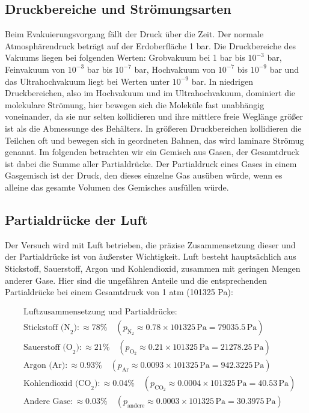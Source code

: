 \subsection{Druckbereiche und Strömungsarten}


Beim Evakuierungsvorgang fällt der Druck über die Zeit. Der normale Atmosphärendruck beträgt auf der Erdoberfläche 1 bar.
Die Druckbereiche des Vakuums liegen bei folgenden Werten:
Grobvakuum bei 1 bar bis $10^{-3}$ bar,  Feinvakuum von $10^{-3}$ bar bis $10^{-7}$ bar, Hochvakuum von $10^{-7}$ bis $10^{-9}$ bar und
das Ultrahochvakuum liegt bei Werten unter $10^{-9}$ bar.
In niedrigen Druckbereichen, also im Hochvakuum und im Ultrahochvakuum, dominiert die molekulare Strömung, hier bewegen sich die Moleküle fast unabhängig voneinander,
da sie nur selten kollidieren und ihre mittlere freie Weglänge größer ist als die Abmessunge des Behälters.
In größeren Druckbereichen kollidieren die Teilchen oft 
und bewegen sich in geordneten Bahnen, das wird laminare Strömug genannt.
Im folgenden betrachten wir ein Gemisch aus Gasen, der Gesamtdruck ist dabei die Summe aller Partialdrücke. Der Partialdruck eines Gases in
einem Gasgemisch ist der Druck, den dieses einzelne Gas ausüben würde, wenn es alleine das gesamte Volumen des Gemisches ausfüllen würde.

\subsection{Partialdrücke der Luft}
Der Versuch wird mit Luft betrieben, die präzise Zusammensetzung dieser und der Partialdrücke ist von äußerster Wichtigkeit.
Luft besteht hauptsächlich aus Stickstoff, Sauerstoff, Argon und Kohlendioxid, zusammen mit geringen Mengen anderer Gase. 
Hier sind die ungefähren Anteile und die entsprechenden Partialdrücke bei einem Gesamtdruck von 1 atm (101325 Pa):


\[

\begin{aligned}
&\text{Luftzusammensetzung und Partialdrücke:} \\
&\text{Stickstoff (N}_2\text{)}: \approx 78\% \quad \left( p_{\text{N}_2} \approx 0.78 \times 101325 \, \text{Pa} = 79035.5 \, \text{Pa} \right)\\
&\text{Sauerstoff (O}_2\text{)}: \approx 21\% \quad \left( p_{\text{O}_2} \approx 0.21 \times 101325 \, \text{Pa} = 21278.25 \, \text{Pa} \right)\\
&\text{Argon (Ar)}: \approx 0.93\% \quad \left( p_{\text{Ar}} \approx 0.0093 \times 101325 \, \text{Pa} = 942.3225 \, \text{Pa} \right)\\
&\text{Kohlendioxid (CO}_2\text{)}: \approx 0.04\% \quad \left( p_{\text{CO}_2} \approx 0.0004 \times 101325 \, \text{Pa} = 40.53 \, \text{Pa} \right)\\
&\text{Andere Gase}: \approx 0.03\% \quad \left( p_{\text{andere}} \approx 0.0003 \times 101325 \, \text{Pa} = 30.3975 \, \text{Pa} \right)\\
\end{aligned}
\]

